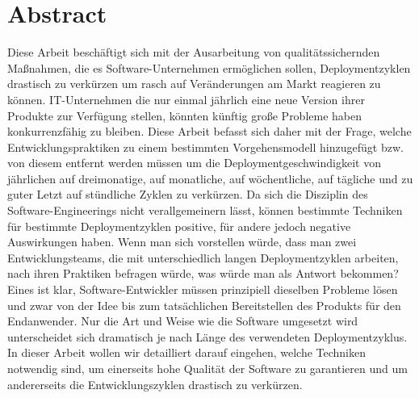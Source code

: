 \section*{Abstract}

Diese Arbeit beschäftigt sich mit der Ausarbeitung von qualitätssichernden
Maßnahmen, die es Software-Unternehmen ermöglichen sollen, Deploymentzyklen
drastisch zu verkürzen um rasch auf Veränderungen am Markt reagieren zu
können. IT-Unternehmen die nur einmal jährlich eine neue Version ihrer
Produkte zur Verfügung stellen, könnten künftig große Probleme haben
konkurrenzfähig zu bleiben. Diese Arbeit befasst sich daher mit der Frage,
welche Entwicklungspraktiken zu einem bestimmten Vorgehensmodell hinzugefügt
bzw. von diesem entfernt werden müssen um die Deploymentgeschwindigkeit von
jährlichen auf dreimonatige, auf monatliche, auf wöchentliche, auf tägliche
und zu guter Letzt auf stündliche Zyklen zu verkürzen. Da sich die Disziplin
des Software-Engineerings nicht verallgemeinern lässt, können bestimmte
Techniken für bestimmte Deploymentzyklen positive, für andere jedoch negative
Auswirkungen haben. Wenn man sich vorstellen würde, dass man zwei
Entwicklungsteams, die mit unterschiedlich langen Deploymentzyklen arbeiten,
nach ihren Praktiken befragen würde, was würde man als Antwort bekommen? Eines
ist klar, Software-Entwickler müssen prinzipiell dieselben Probleme lösen und
zwar von der Idee bis zum tatsächlichen Bereitstellen des Produkts für den
Endanwender. Nur die Art und Weise wie die Software umgesetzt wird
unterscheidet sich dramatisch je nach Länge des verwendeten Deploymentzyklus.
In dieser Arbeit wollen wir detailliert darauf eingehen, welche Techniken
notwendig sind, um einerseits hohe Qualität der Software zu garantieren und um
andererseits die Entwicklungszyklen drastisch zu verkürzen.
